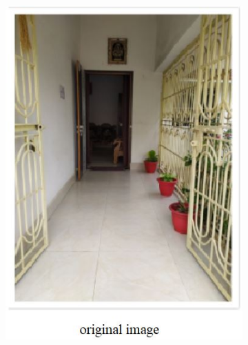 \documentclass[a4paper]{article}
\begin{document}
\begin{figure}[H]
\begin{subfigure}{.3\textwidth}
		\includegraphics[width=.9\linewidth]{q1_1}
	\end{subfigure}
	\caption{}
\end{figure}
\end{document}
